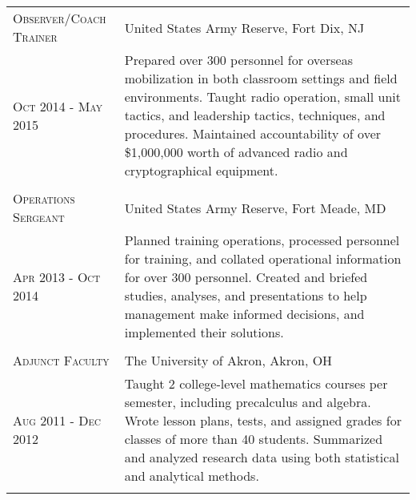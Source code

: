 \documentclass[letterpaper,10pt]{article} %
\begin{document}
\begin{center}
\begin{tabular}{R{4.25cm}L{11.25cm}}

\textsc{Observer/Coach Trainer} & United States Army Reserve, Fort Dix, NJ\\ 
\textsc{Oct 2014 - May 2015} & Prepared over 300 personnel for overseas mobilization in both classroom settings and field environments.  Taught radio operation, small unit tactics, and leadership tactics, techniques, and procedures.  Maintained accountability of over \$1,000,000 worth of advanced radio and cryptographical equipment.\\
 \\


\textsc{Operations Sergeant} & United States Army Reserve, Fort Meade, MD\\
\textsc{Apr 2013 - Oct 2014} & Planned training operations, processed personnel for training, and collated operational information for over 300 personnel.  Created and briefed studies, analyses, and presentations to help management make informed decisions, and implemented their solutions.\\
 \\


\textsc{Adjunct Faculty} & The University of Akron, Akron, OH\\
\textsc{Aug 2011 - Dec 2012} & Taught 2 college-level mathematics courses per semester, including precalculus and algebra.  Wrote lesson plans, tests, and assigned grades for classes of more than 40 students.  Summarized and analyzed research data using both statistical and analytical methods.\\
 \\

\end{tabular}
\end{center}
\end{document}
